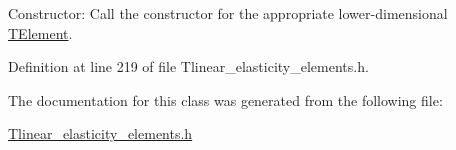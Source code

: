Constructor\+: Call the constructor for the appropriate lower-\/dimensional \hyperlink{classoomph_1_1TElement}{T\+Element}. 



Definition at line 219 of file Tlinear\+\_\+elasticity\+\_\+elements.\+h.



The documentation for this class was generated from the following file\+:\begin{DoxyCompactItemize}
\item 
\hyperlink{Tlinear__elasticity__elements_8h}{Tlinear\+\_\+elasticity\+\_\+elements.\+h}\end{DoxyCompactItemize}
